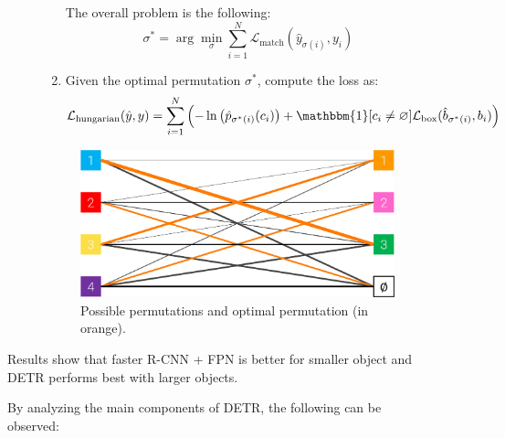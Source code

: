 \begin{description}
\begin{description}
\begin{enumerate}
                    The overall problem is the following:
                    \[ \sigma^* = \arg\min_\sigma \sum_{i=1}^{N} \mathcal{L}_\text{match}(\hat{y}_{\sigma(i)}, y_i) \]

                    \item Given the optimal permutation $\sigma^*$, compute the loss as:
                    \[ \mathcal{L}_\text{hungarian}(\hat{y}, y) = \sum_{i=1}^{N} \left( - \ln\left( \hat{p}_{\sigma^*(i)}(c_i) \right) + \mathbbm{1}[c_i \neq \varnothing] \mathcal{L}_\text{box}(\hat{b}_{\sigma^*(i)}, b_i) \right) \]
                \end{enumerate}

                \begin{figure}[H]
                    \centering
                    \includegraphics[width=0.5\linewidth]{./img/hungarian_loss.png}
                    \caption{
                        Possible permutations and optimal permutation (in orange).
                    }
                \end{figure}
        \end{description}

        \begin{remark}
            Results show that faster R-CNN + FPN is better for smaller object and DETR performs best with larger objects.
        \end{remark}

        \begin{remark}[Visualization]
            By analyzing the main components of DETR, the following can be observed:
\end{remark}
\end{description}
